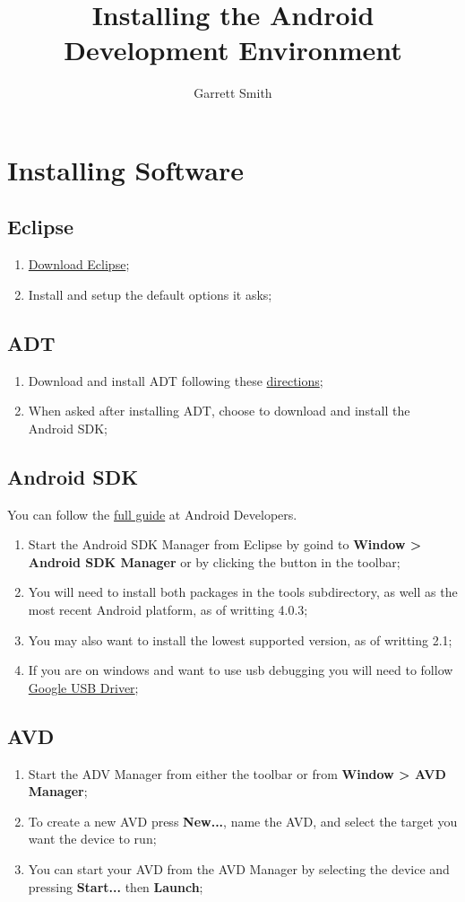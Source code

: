 \documentclass{article}
\title{Installing the Android Development Environment}
\author{Garrett Smith}
\begin{document}
\section{Installing Software}

\subsection{Eclipse}
\begin{enumerate}
  \item
    \href{http://www.eclipse.org/downloads/}{Download Eclipse};
  \item
    Install and setup the default options it asks;
\end{enumerate}

\subsection{ADT}
\begin{enumerate}
  \item
    Download and install ADT following these \href{http://developer.android.com/sdk/eclipse-adt.html#downloading}{directions};
  \item
    When asked after installing ADT, choose to download and install the Android SDK;
\end{enumerate}

\subsection{Android SDK}
You can follow the \href{http://developer.android.com/sdk/installing.html}{full guide} at Android Developers.
\begin{enumerate}
  \item
    Start the Android SDK Manager from Eclipse by goind to \textbf{Window > Android SDK Manager} or by clicking the button in the toolbar;
  \item
    You will need to install both packages in the tools subdirectory, as well as the most recent Android platform, as of writting 4.0.3;
  \item
    You may also want to install the lowest supported version, as of writting 2.1;
  \item 
    If you are on windows and want to use usb debugging you will need to follow \href{http://developer.android.com/sdk/win-usb.html}{Google USB Driver};
\end{enumerate}

\subsection{AVD}
\begin{enumerate}
  \item
    Start the ADV Manager from either the toolbar or from \textbf{Window > AVD Manager};
  \item
    To create a new AVD press \textbf{New...}, name the AVD, and select the target you want the device to run;
  \item
    You can start your AVD from the AVD Manager by selecting the device and pressing \textbf{Start...} then \textbf{Launch};
\end{enumerate}
\end{document}
